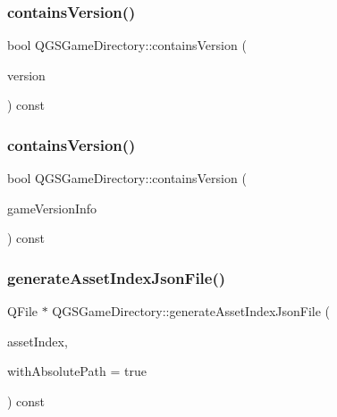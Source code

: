\mbox{\label{class_q_g_s_game_directory_ac7ffc5f939d69fea1a609fc516fbb96c}} 
\subsubsection{\texorpdfstring{contains\+Version()}{containsVersion()}\hspace{0.1cm}{\footnotesize\ttfamily [1/2]}}
{\footnotesize\ttfamily bool Q\+G\+S\+Game\+Directory\+::contains\+Version (\begin{DoxyParamCaption}\item[{const Q\+String \&}]{version }\end{DoxyParamCaption}) const}

\mbox{\label{class_q_g_s_game_directory_a725227fce0dc089f036f90ae5b44caae}} 
\subsubsection{\texorpdfstring{contains\+Version()}{containsVersion()}\hspace{0.1cm}{\footnotesize\ttfamily [2/2]}}
{\footnotesize\ttfamily bool Q\+G\+S\+Game\+Directory\+::contains\+Version (\begin{DoxyParamCaption}\item[{const \mbox{\hyperlink{class_q_g_s_game_version_info}{Q\+G\+S\+Game\+Version\+Info}} \&}]{game\+Version\+Info }\end{DoxyParamCaption}) const}

\mbox{\label{class_q_g_s_game_directory_abda3cdbf34c8c6649aa85d05ee3e83d2}} 
\subsubsection{\texorpdfstring{generate\+Asset\+Index\+Json\+File()}{generateAssetIndexJsonFile()}\hspace{0.1cm}{\footnotesize\ttfamily [1/3]}}
{\footnotesize\ttfamily Q\+File $\ast$ Q\+G\+S\+Game\+Directory\+::generate\+Asset\+Index\+Json\+File (\begin{DoxyParamCaption}\item[{const \mbox{\hyperlink{class_q_g_s_asset_index}{Q\+G\+S\+Asset\+Index}} \&}]{asset\+Index,  }\item[{const bool}]{with\+Absolute\+Path = {\ttfamily true} }\end{DoxyParamCaption}) const}

